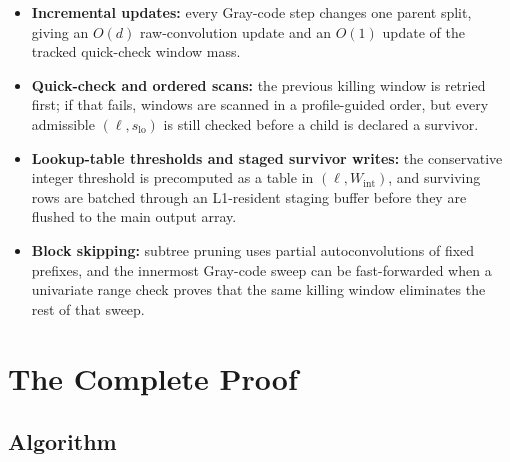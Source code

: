 \documentclass[11pt, letterpaper]{article}
\theoremstyle{paperplain}
\theoremstyle{paperdef}
\begin{document}
\begin{itemize}
  \item \textbf{Incremental updates:} every Gray-code step changes one
    parent split, giving an $O(d)$ raw-convolution update and an
    $O(1)$ update of the tracked quick-check window mass.
  \item \textbf{Quick-check and ordered scans:} the previous killing
    window is retried first; if that fails, windows are scanned in a
    profile-guided order, but every admissible
    $(\ell,s_{\mathrm{lo}})$ is still checked before a child is
    declared a survivor.
  \item \textbf{Lookup-table thresholds and staged survivor writes:}
    the conservative integer threshold is precomputed as a table in
    $(\ell,W_{\mathrm{int}})$, and surviving rows are batched through
    an L1-resident staging buffer before they are flushed to the main
    output array.
  \item \textbf{Block skipping:} subtree pruning uses partial
    autoconvolutions of fixed prefixes, and the innermost Gray-code
    sweep can be fast-forwarded when a univariate range check proves
    that the same killing window eliminates the rest of that sweep.
\end{itemize}


\section{The Complete Proof}\label{sec:algorithm}

\subsection{Algorithm}
\end{document}
